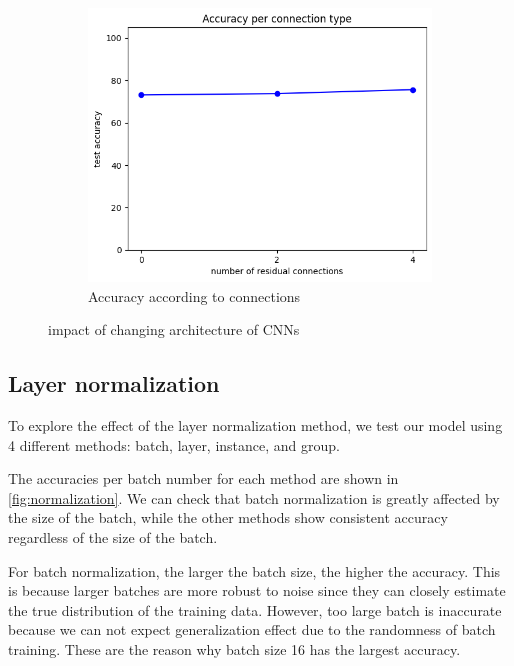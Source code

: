 \begin{figure}[htbp]
    \hfill
	\begin{subfigure}[t]{0.3\linewidth}
		\centering
		\includegraphics[width=\linewidth]{image/q4-2-connection.png}
		\caption{Accuracy according to connections}
		\label{fig:q4-2-connection}
	\end{subfigure}

	\caption{impact of changing architecture of CNNs}
	\label{fig:cnn_architecture}
\end{figure}

\subsection{Layer normalization}
To explore the effect of the layer normalization method, we test our model using 4 different methods: batch, layer, instance, and group.

The accuracies per batch number for each method are shown in \cref{fig:normalization}. We can check that batch normalization is greatly affected by the size of the batch, while the other methods show consistent accuracy regardless of the size of the batch.

For batch normalization, the larger the batch size, the higher the accuracy. This is because larger batches are more robust to noise since they can closely estimate the true distribution of the training data. However, too large batch is inaccurate because we can not expect generalization effect due to the randomness of batch training. These are the reason why batch size 16 has the largest accuracy.

